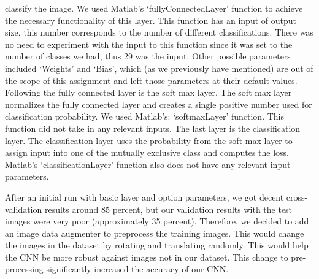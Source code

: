 \documentclass[conference]{IEEEtran}
\begin{document}
classify the image. We used Matlab’s ‘fullyConnectedLayer’ function to achieve the necessary functionality of this layer. This function has an input of output size, this number corresponds to the number of different classifications. There was no need to experiment with the input to this function since it was set to the number of classes we had, thus 29 was the input. Other possible parameters included ‘Weights’ and ‘Bias’, which (as we previously have mentioned) are out of the scope of this assignment and left those parameters at their default values. Following the fully connected layer is the soft max layer. The soft max layer normalizes the fully connected layer and creates a single positive number used for classification probability. We used Matlab’s: ‘softmaxLayer’ function. This function did not take in any relevant inputs. The last layer is the classification layer. The classification layer uses the probability from the soft max layer to assign input into one of the mutually exclusive class and computes the loss. Matlab’s ‘classificationLayer’ function also does not have any relevant input parameters. 

After an initial run with basic layer and option parameters, we got decent cross-validation results around 85 percent, but our validation results with the test images were very poor (approximately 35 percent). Therefore, we decided to add an image data augmenter to preprocess the training images. This would change the images in the dataset by rotating and translating randomly. This would help the CNN be more robust against images not in our dataset. This change to pre-processing significantly increased the accuracy of our CNN. 
\end{document}
